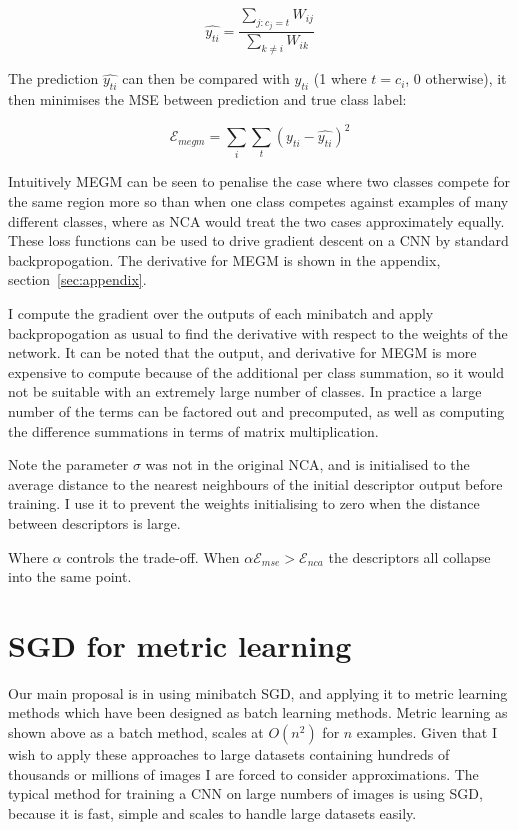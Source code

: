 \begin{equation}
\label{eq:megm_pred}
\hat{y_{ti}} = \frac{\sum_{j:c_j = t}W_{ij}}{\sum_{k \neq i}{W_{ik}}}
\end{equation}

The prediction $ \hat{y_{ti}} $ can then be compared with $ y_{ti} $ (1 where $ t = c_i $, 0 otherwise), it then minimises the \gls{MSE} between prediction and true class label:

\begin{equation}
\label{eq:megm_loss}
\mathcal{E}_{megm} =  \sum_i\sum_t{(y_{ti} - \hat{y_{ti}})^2}
\end{equation}

Intuitively \gls{MEGM} can be seen to penalise the case where two classes compete for the same region more so than when one class competes against examples of many different classes, where as \gls{NCA} would treat the two cases approximately equally. These loss functions can be used to drive gradient descent on a \gls{CNN} by standard backpropogation. The derivative for \gls{MEGM} is shown in the appendix, section~\ref{sec:appendix}.

I compute the gradient over the outputs of each minibatch and apply backpropogation as usual to find the derivative with respect to the weights of the network. It can be noted that the output, and derivative for \gls{MEGM} is more expensive to compute because of the additional per class summation, so it would not be suitable with an extremely large number of classes. In practice a large number of the terms can be factored out and precomputed, as well as computing the difference summations in terms of matrix multiplication.

Note the parameter $ \sigma $ was not in the original NCA, and is initialised to the average distance to the nearest neighbours of the initial descriptor output before training. I use it to prevent the weights initialising to zero when the distance between descriptors is large.


Where $\alpha $ controls the trade-off. When $ \alpha \mathcal{E}_{mse} > \mathcal{E}_{nca} $ the descriptors all collapse into the same point.


\section{SGD for metric learning}

Our main proposal is in using minibatch \gls{SGD}, and applying it to metric learning methods which have been designed as batch learning methods. Metric learning as shown above as a batch method, scales at $ O(n^2) $ for $ n $ examples. Given that I wish to apply these approaches to large datasets containing hundreds of thousands or millions of images I are forced to consider approximations. The typical method for training a \gls{CNN} on large numbers of images is using \gls{SGD}, because it is fast, simple and scales to handle large datasets easily. 

